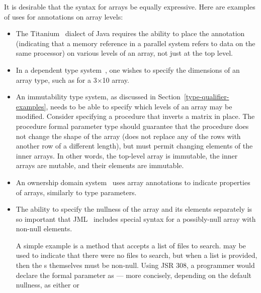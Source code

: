 \documentclass[10pt]{article}
\begin{document}
It is desirable that the syntax for arrays be equally expressive.
Here are examples of uses for annotations on array levels:
\begin{itemize}
\item
  The Titanium~\cite{YelickSPMLKHGGCA1998} dialect of Java requires the
  ability to place the
   annotation (indicating that a memory reference in a parallel
  system refers to data on the same processor) on various levels of an
  array, not just at the top level.
\item
  In a dependent type system~\cite{PfenningF:deptlp,Xi1998,Xi-Pfenning99},
  one wishes to specify the dimensions of an
  array type, such as  for a
  3$\times$10 array.
\item
  An immutability type system, as discussed in Section~\ref{type-qualifier-examples},
  needs to be able to specify which levels of
  an array may be modified.  Consider specifying a procedure that inverts a
  matrix in place.  The procedure formal parameter type should guarantee that the procedure
  does not change the shape of the array (does not replace any of the rows
  with another row of a different length), but must permit changing
  elements of the inner arrays.  In other words, the top-level array is
  immutable, the inner arrays are mutable, and their elements
  are immutable.
\item
  An ownership domain system~\cite{AbiAntounA2006:OOPSLA} uses array
  annotations to indicate properties of arrays, similarly to type
  parameters.
\item
  \newcommand{\bs}{\char"5C}
  The ability to specify the nullness of the array and its elements
  separately is so important that JML~\cite{LeavensBR2006:JML} includes
  special syntax \code{\bs nonnullelements(a)} for a possibly-null array
   with non-null elements.

  A simple example is a method that accepts a list of files to search.
   may be used to indicate that there were no files to search,
  but when a list is provided, then the s themselves must be
  non-null.  Using JSR 308, a programmer would declare the formal parameter as
   --- more concisely,
  depending on the default nullness, as either  or 


\end{itemize}
\end{document}
